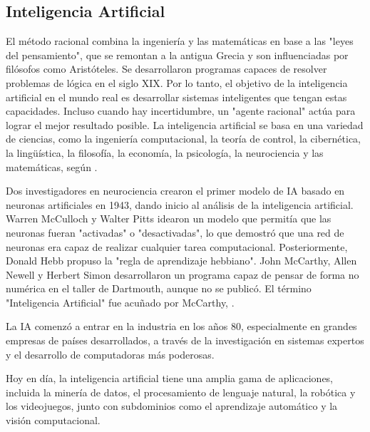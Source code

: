 \subsection{Inteligencia Artificial}

El método racional combina la ingeniería y las matemáticas en base a las "leyes del pensamiento", que se remontan a la antigua Grecia y son influenciadas por filósofos como Aristóteles. Se desarrollaron programas capaces de resolver problemas de lógica en el siglo XIX. Por lo tanto, el objetivo de la inteligencia artificial en el mundo real es desarrollar sistemas inteligentes que tengan estas capacidades. Incluso cuando hay incertidumbre, un "agente racional" actúa para lograr el mejor resultado posible. La inteligencia artificial se basa en una variedad de ciencias, como la ingeniería computacional, la teoría de control, la cibernética, la lingüística, la filosofía, la economía, la psicología, la neurociencia y las matemáticas, según \parencite{bk_russell2004intart}.

Dos investigadores en neurociencia crearon el primer modelo de IA basado en neuronas artificiales en 1943, dando inicio al análisis de la inteligencia artificial. Warren McCulloch y Walter Pitts idearon un modelo que permitía que las neuronas fueran "activadas" o "desactivadas", lo que demostró que una red de neuronas era capaz de realizar cualquier tarea computacional. Posteriormente, Donald Hebb propuso la "regla de aprendizaje hebbiano". John McCarthy, Allen Newell y Herbert Simon desarrollaron un programa capaz de pensar de forma no numérica en el taller de Dartmouth, aunque no se publicó. El término "Inteligencia Artificial" fue acuñado por McCarthy, \parencite{bk_russell2004intart}.

La IA comenzó a entrar en la industria en los años 80, especialmente en grandes empresas de países desarrollados, a través de la investigación en sistemas expertos y el desarrollo de computadoras más poderosas.

Hoy en día, la inteligencia artificial tiene una amplia gama de aplicaciones, incluida la minería de datos, el procesamiento de lenguaje natural, la robótica y los videojuegos, junto con subdominios como el aprendizaje automático y la visión computacional.

